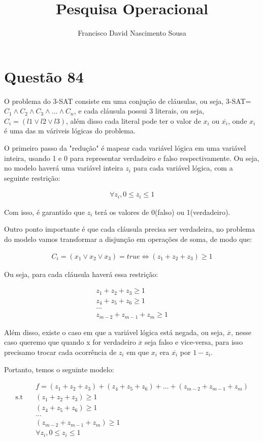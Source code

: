 \documentclass[]{article}
\title{Pesquisa Operacional}
\author{Francisco David Nascimento Sousa}
\numberwithin{equation}{section}
\begin{document}
\section{Questão 84}

O problema do 3-SAT consiste em uma conjução de cláusulas, ou seja, 3-SAT= $C_1 \wedge C_2 \wedge C_3 \wedge ... \wedge C_n$, e cada cláusula possui 3 literais, ou seja, $C_i = (l1 \vee l2 \vee l3)$, além disso cada literal pode ter o valor
de $x_i$ ou $\overline{x_i}$, onde $x_i$ é uma das m váriveis lógicas do problema.

O primeiro passo da "redução" é mapear cada variável lógica em uma variável inteira, usando 1 e 0 para representar verdadeiro e falso respectivamente. Ou seja, no modelo haverá uma variável inteira $z_i$ para cada variável lógica, com a seguinte restrição:

\begin{align}
     \forall{z_i}, 0 \leq z_i \leq 1
\end{align}

Com isso, é garantido que $z_i$ terá os valores de 0(falso) ou 1(verdadeiro).

Outro ponto importante é que cada cláusula precisa ser verdadeira, no problema do modelo vamos transformar a disjunção em operações de soma, de modo que:

\begin{align}
   C_i = (x_1 \vee x_2 \vee x_3) = true \Leftrightarrow (z_1 + z_2 + z_3) \geq 1
\end{align}

Ou seja, para cada cláusula haverá essa restrição:

\begin{align}
     z_1 + z_2 + z_3 \geq 1 \\
     z_4 + z_5 + z_6 \geq 1 \\
     ... \\
     z_{m-2} + z_{m-1} + z_m \geq 1
\end{align}

Além disso, existe o caso em que a variável lógica está negada, ou seja, $\overline{x}$, nesse caso queremo que quando x for verdadeiro $\overline{x}$ seja falso e vice-versa, para isso precisamo trocar cada ocorrência de $z_i$ em que $x_i$ era $\overline{x_i}$ por $1 - z_i$.

Portanto, temos o seguinte modelo:

\begin{align}
&\quad f = (z_1 + z_2 + z_3) + (z_4 + z_5 + z_6) + ... + (z_{m-2} + z_{m-1} + z_m) \\
\text{s.t}  &\quad  (z_1 + z_2 + z_3) \geq 1 \\
            &\quad  (z_4 + z_5 + z_6) \geq 1 \\
            &\quad  ... \\
            &\quad  (z_{m-2} + z_{m-1} + z_m) \geq 1 \\
            &\quad \forall{z_i}, 0 \leq z_i \leq 1
\end{align}
\end{document}
